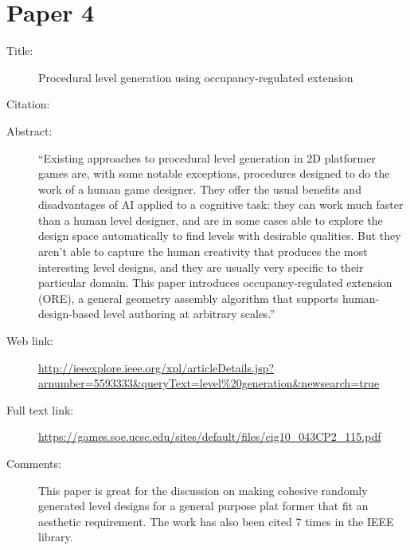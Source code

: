\documentclass{scrartcl}
\begin{document}
\section*{Paper 4}
\begin{description}
\item[Title:] Procedural level generation using occupancy-regulated extension
\item[Citation:] \cite{Mawhorter}
\item[Abstract:] ``Existing approaches to procedural level generation in 2D platformer games are, with some notable exceptions, procedures designed to do the work of a human game designer. They offer the usual benefits and disadvantages of AI applied to a cognitive task: they can work much faster than a human level designer, and are in some cases able to explore the design space automatically to find levels with desirable qualities. But they aren't able to capture the human creativity that produces the most interesting level designs, and they are usually very specific to their particular domain. This paper introduces occupancy-regulated extension (ORE), a general geometry assembly algorithm that supports human-design-based level authoring at arbitrary scales.''
\item[Web link:] \url{http://ieeexplore.ieee.org/xpl/articleDetails.jsp?arnumber=5593333&queryText=level\%20generation&newsearch=true}
\item[Full text link:] \url{https://games.soe.ucsc.edu/sites/default/files/cig10_043CP2_115.pdf}
\item[Comments:] This paper is great for the discussion on making cohesive randomly generated level designs for a general purpose plat former that fit an aesthetic requirement. The work has also been cited 7 times in the IEEE library.
\end{description}
\end{document}
